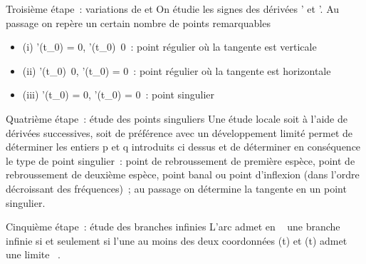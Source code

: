 \documentclass[]{article}
\begin{document}
Troisième étape~: variations de \phi et \psi On étudie les signes des dérivées
\phi' et \psi'. Au passage on repère un certain nombre de points remarquables

\begin{itemize}
\itemsep1pt\parskip0pt
\item
  (i) \phi'(t\_0) = 0,
  \psi'(t\_0)\neq~0~: point régulier où la
  tangente est verticale
\item
  (ii) \phi'(t\_0)\neq~0, \psi'(t\_0) =
  0~: point régulier où la tangente est horizontale
\item
  (iii) \phi'(t\_0) = 0, \psi'(t\_0) = 0~: point singulier
\end{itemize}

Quatrième étape~: étude des points singuliers Une étude locale soit à
l'aide de dérivées successives, soit de préférence avec un développement
limité permet de déterminer les entiers p et q introduits ci dessus et
de déterminer en conséquence le type de point singulier~: point de
rebroussement de première espèce, point de rebroussement de deuxième
espèce, point banal ou point d'inflexion (dans l'ordre décroissant des
fréquences)~; au passage on détermine la tangente en un point singulier.

Cinquième étape~: étude des branches infinies L'arc admet en \alpha~
\in\overlineD une branche infinie si et seulement si
l'une au moins des deux coordonnées \phi(t) et \psi(t) admet une limite \infty~.
\end{document}

